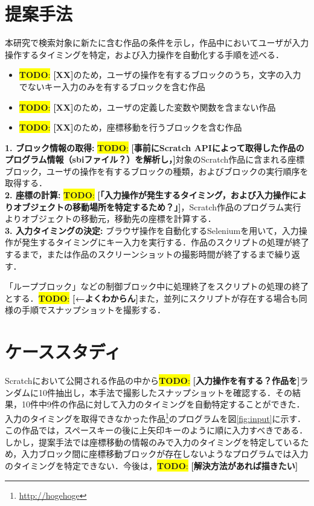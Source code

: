 \documentclass[uplatex,dvipdfmx,a4paper,twocolumn,base=11pt,jbase=11pt,ja=standard]{bxjsarticle}  %
\newcommand{\todo}[1]{\colorbox{yellow}{{\bf TODO}:}{\color{red} {\textbf{[#1]}}}}
\begin{document}
\section{提案手法}
本研究で検索対象に新たに含む作品の条件を示し，作品中においてユーザが入力操作するタイミングを特定，および入力操作を自動化する手順を述べる．%
\begin{itemize}
 \item \todo{XX}のため，ユーザの操作を有するブロックのうち，文字の入力でないキー入力のみを有するブロックを含む作品
 \item \todo{XX}のため，ユーザの定義した変数や関数を含まない作品
 \item \todo{XX}のため，座標移動を行うブロックを含む作品
\end{itemize}

\noindent\textbf{1. ブロック情報の取得: }\todo{事前にScratch APIによって取得した作品のプログラム情報（sbiファイル？）を解析し，}対象のScratch作品に含まれる座標ブロック，ユーザの操作を有するブロックの種類，およびブロックの実行順序を取得する．\\
\noindent\textbf{2. 座標の計算: }\todo{「入力操作が発生するタイミング，および入力操作によりオブジェクトの移動場所を特定するため？」}，Scratch作品のプログラム実行よりオブジェクトの移動元，移動先の座標を計算する．\\
\noindent\textbf{3. 入力タイミングの決定: }ブラウザ操作を自動化するSeleniumを用いて，入力操作が発生するタイミングにキー入力を実行する．作品のスクリプトの処理が終了するまで，または作品のスクリーンショットの撮影時間が終了するまで繰り返す．


「ループブロック」などの制御ブロック中に処理終了をスクリプトの処理の終了とする．\todo{←よくわからん}また，並列にスクリプトが存在する場合も同様の手順でスナップショットを撮影する．

\section{ケーススタディ}

Scratchにおいて公開される作品の中から\todo{入力操作を有する？作品を}ランダムに10件抽出し，本手法で撮影したスナップショットを確認する．その結果，10件中9件の作品に対して入力のタイミングを自動特定することができた．入力のタイミングを取得できなかった作品\footnote{\url{http://hogehoge}}のプログラムを図\ref{fig:input}に示す．この作品では，スペースキーの後に上矢印キーのように順に入力すべきである．しかし，提案手法では座標移動の情報のみで入力のタイミングを特定しているため，入力ブロック間に座標移動ブロックが存在しないようなプログラムでは入力のタイミングを特定できない．今後は，\todo{解決方法があれば描きたい}
\end{document}
